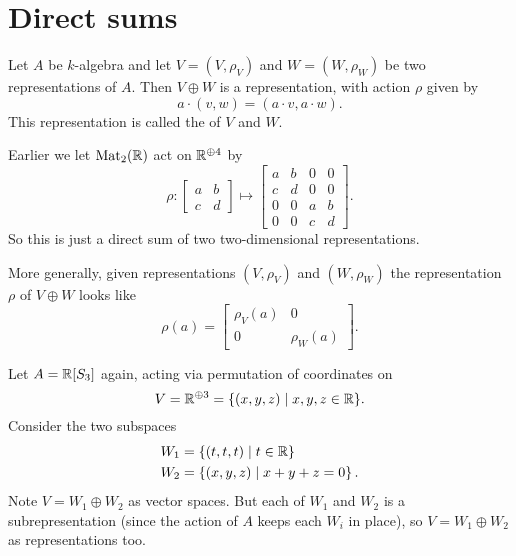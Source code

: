 \section{Direct sums}
\begin{definition}
	Let $A$ be $k$-algebra and let $V = (V, \rho_V)$ and $W = (W, \rho_W)$
	be two representations of $A$.
	Then $V \oplus W$ is a representation, with action $\rho$ given by
	\[ a \cdot (v,w) = (a \cdot v, a \cdot w). \]
	This representation is called the  of $V$ and $W$.
\end{definition}
\begin{example}
	Earlier we let $\mathrm{Mat}_2(\mathbb R)$ act on $\mathbb R^{\oplus 4}$ by
	\[
		\rho :
		\begin{bmatrix} a & b \\ c & d \end{bmatrix}
		\mapsto
		\begin{bmatrix} a & b & 0 & 0 \\ c & d & 0 & 0 \\
			0 & 0 & a & b \\ 0 & 0 & c & d \end{bmatrix} .
	\]
	So this is just a direct sum of two two-dimensional representations.
\end{example}
More generally, given representations $(V, \rho_V)$ and $(W, \rho_W)$
the representation $\rho$ of $V \oplus W$ looks like
\[ \rho(a) =
	\begin{bmatrix}
		\rho_V(a) & 0 \\ 0 & \rho_W(a)
	\end{bmatrix}.
\]
\begin{example}
	Let $A = \mathbb R[S_3]$ again,
	acting via permutation of coordinates on
	\[ V = \mathbb R^{\oplus 3} = \{ (x,y,z) \mid x,y,z \in \mathbb R \}. \]
	Consider the two subspaces
	\begin{align*}
		W_1 &= \left\{ (t,t,t) \mid t \in \mathbb R \right\} \\
		W_2 &= \left\{ (x,y,z) \mid x+y+z = 0 \right\}.
	\end{align*}
	Note $V = W_1 \oplus W_2$ as vector spaces.
	But each of $W_1$ and $W_2$ is a subrepresentation
	(since the action of $A$ keeps each $W_i$ in place),
	so $V = W_1 \oplus W_2$ as representations too.
\end{example}

